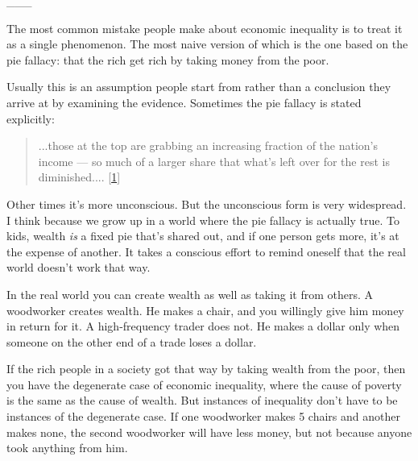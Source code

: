                   \_\_\_
                  

The most common mistake people make about economic
                  inequality is to treat it as a single phenomenon. The most
                  naive version of which is the one based on the pie fallacy:
                  that the rich get rich by taking money from the poor.

Usually
                  this is an assumption people start from rather than a
                  conclusion they arrive at by examining the evidence. Sometimes
                  the pie fallacy is stated explicitly:
                  \begin{quote}

                    ...those at the top are grabbing an increasing fraction of
                    the nation's income --- so much of a larger share that
                    what's left over for the rest is diminished....
                    [\href{\#f1n}{1}]
                  
\end{quote}

                  Other times it's more unconscious. But the unconscious form is
                  very widespread. I think because we grow up in a world where
                  the pie fallacy is actually true. To kids, wealth \emph{is} a
                  fixed pie that's shared out, and if one person gets more, it's
                  at the expense of another. It takes a conscious effort to
                  remind oneself that the real world doesn't work that way.

In
                  the real world you can create wealth as well as taking it from
                  others. A woodworker creates wealth. He makes a chair, and you
                  willingly give him money in return for it. A high-frequency
                  trader does not. He makes a dollar only when someone on the
                  other end of a trade loses a dollar.

If the rich
                  people in a society got that way by taking wealth from the
                  poor, then you have the degenerate case of economic
                  inequality, where the cause of poverty is the same as the
                  cause of wealth. But instances of inequality don't have to be
                  instances of the degenerate case. If one woodworker makes 5
                  chairs and another makes none, the second woodworker will have
                  less money, but not because anyone took anything from him.

